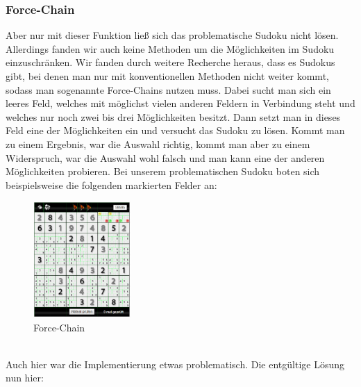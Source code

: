 \documentclass[11pt,a4paper]{article}
\begin{document}
\subsubsection{Force-Chain}
Aber nur mit dieser Funktion ließ sich das problematische Sudoku nicht lösen. Allerdings fanden wir auch keine Methoden um die Möglichkeiten im Sudoku einzuschränken. Wir fanden durch weitere Recherche heraus, dass es Sudokus gibt, bei denen man nur mit konventionellen Methoden nicht weiter kommt, sodass man sogenannte Force-Chains nutzen muss. Dabei sucht man sich ein leeres Feld, welches mit möglichst vielen anderen Feldern in Verbindung steht und welches nur noch zwei bis drei Möglichkeiten besitzt. Dann setzt man in dieses Feld eine der Möglichkeiten ein und versucht das Sudoku zu lösen. Kommt man zu einem Ergebnis, war die Auswahl richtig, kommt man aber zu einem Widerspruch, war die Auswahl wohl falsch und man kann eine der anderen Möglichkeiten probieren. Bei unserem problematischen Sudoku boten sich beispielsweise die folgenden markierten Felder an:
\ \\
\begin{figure}[htbp!]
\begin{center}
\includegraphics[width=0.33\textwidth]{sudoku7.pdf}
\end{center}
\caption{Force-Chain}
\end{figure}
\ \\ 
Auch hier war die Implementierung etwas problematisch. Die entgültige Lösung nun hier:
\\
\end{document}
